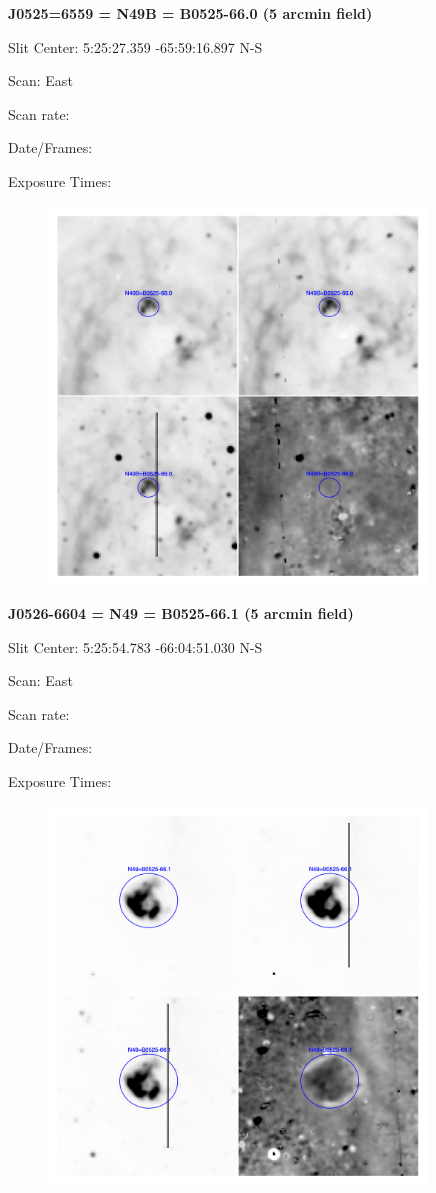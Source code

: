 \documentclass[11pt]{article}
\begin{document}
\newpage
{\bf J0525=6559 = N49B = B0525-66.0 (5 arcmin field)}  
 
Slit Center:   5:25:27.359   -65:59:16.897 N-S

Scan:  East

Scan rate:  

Date/Frames:

Exposure Times:  

\begin{figure}
\includegraphics[width=10.05cm]{snapshots/N49B_5arcmin.png}
\end{figure}

\newpage
{\bf J0526-6604 = N49 = B0525-66.1 (5 arcmin field)}  
 
Slit Center:   5:25:54.783   -66:04:51.030 N-S

Scan:  East

Scan rate:  

Date/Frames:

Exposure Times:  

\begin{figure}
\includegraphics[width=10.05cm]{snapshots/N49_5arcmin.png}
\end{figure}
\end{document}
